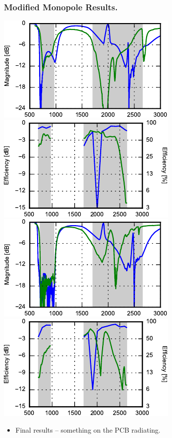 \begin{frame}
  \frametitle{Modified Monopole Results.}
\begin{center}
    \includegraphics{img/Lasse/tuner_pcb/002_s11top.pdf}
    \includegraphics{img/Lasse/tuner_pcb/002_efftop.pdf} \\
    \includegraphics{img/Lasse/tuner_pcb/002_s22side.pdf}
    \includegraphics{img/Lasse/tuner_pcb/002_effside.pdf}
\end{center}
\vspace{-3mm}
      \begin{itemize}
      \item Final results -- something on the PCB radiating.
      \end{itemize}
\legendfooter
\end{frame}
\def\legendfooter{\scriptsize{Upper: Top antenna. Lower: Side antenna. \textcolor{bb}{Monopole without cap}, \textcolor{gg}{Monopole with cap}, Frequency in MHz.}}
\def\emptyline{\textcolor{white}{Empty}}


